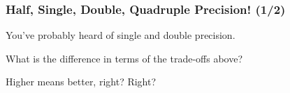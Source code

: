 \begin{frame}

\frametitle{Half, Single, Double, Quadruple Precision! (1/2)}

\vspace{\fill}

\begin{center}

You've probably heard of single and double precision.

\vspace{\fill}

What is the difference in terms of the trade-offs above?

Higher means better, right? Right?

\end{center}

\vspace{\fill}

\end{frame}

